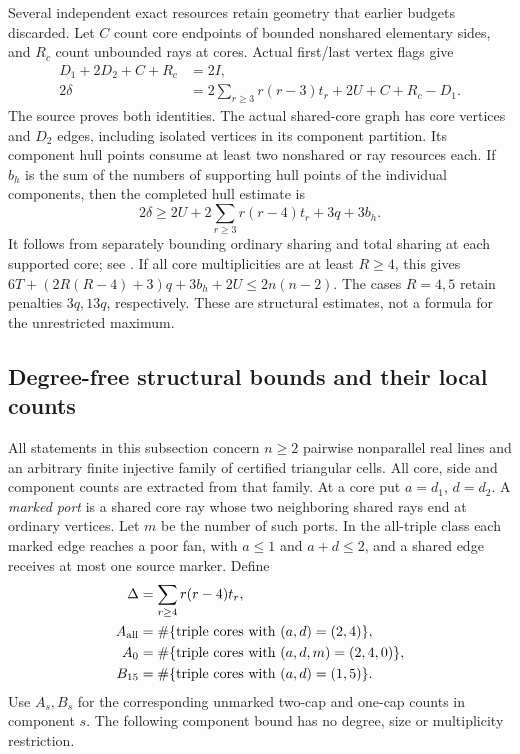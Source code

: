 Several independent exact resources retain geometry that earlier budgets
discarded. Let $C$ count core endpoints of bounded nonshared elementary
sides, and $R_c$ count unbounded rays at cores. Actual first/last vertex
flags give
\begin{align}
 D_1+2D_2+C+R_c&=2I,\\
 2\delta&=2\sum_{r\ge3}r(r-3)t_r+2U+C+R_c-D_1.
 \label{upper:ray-identities}
\end{align}
The source  proves both identities.
The actual shared-core graph has core vertices and $D_2$ edges, including
isolated vertices in its component partition. Its component hull points
consume at least two nonshared or ray resources each. If $b_h$ is the
sum of the numbers of supporting hull points of the individual components,
then the completed hull estimate is
\begin{equation}
 2\delta\ge2U+2\sum_{r\ge3}r(r-4)t_r+3q+3b_h.
 \label{upper:component-hull}
\end{equation}
It follows from separately bounding ordinary sharing and total sharing
at each supported core; see
.
If all core multiplicities are at least $R\ge4$, this gives
$6T+(2R(R-4)+3)q+3b_h+2U\le2n(n-2)$.
The cases $R=4,5$ retain penalties $3q,13q$, respectively.
These are structural estimates, not a formula for the unrestricted maximum.

\subsection{Degree-free structural bounds and their local counts}
\label{upper:degree-free}

All statements in this subsection concern $n\ge2$ pairwise nonparallel
real lines and an arbitrary finite injective family of certified triangular
cells. All core, side and component counts are extracted from that family.
At a core put $a=d_1$, $d=d_2$. A \emph{marked port} is a shared core ray
whose two neighboring shared rays end at ordinary vertices. Let $m$ be
the number of such ports. In the all-triple class each marked edge reaches a poor fan,
with $a\le1$ and $a+d\le2$, and a shared edge receives at most one source
marker. Define
\begin{align*}
 \Delta&=\sum_{r\ge4}r(r-4)t_r,\\
 A_{\rm all}&=\#\{\text{triple cores with }(a,d)=(2,4)\},\\
 A_0&=\#\{\text{triple cores with }(a,d,m)=(2,4,0)\},\\
 B_{15}&=\#\{\text{triple cores with }(a,d)=(1,5)\}.
\end{align*}
Use $A_s,B_s$ for the corresponding unmarked two-cap and one-cap
counts in component $s$. The following component bound has no degree,
size or multiplicity restriction.


